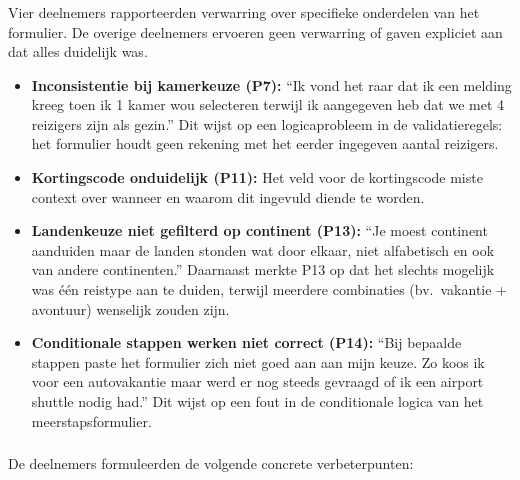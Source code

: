 \subsubsection{}

Vier deelnemers rapporteerden verwarring over specifieke onderdelen van het formulier. De overige deelnemers ervoeren geen verwarring of gaven expliciet aan dat alles duidelijk was.

\begin{itemize}
  \item \textbf{Inconsistentie bij kamerkeuze (P7):} ``Ik vond het raar dat ik een melding kreeg toen ik 1 kamer wou selecteren terwijl ik aangegeven heb dat we met 4 reizigers zijn als gezin.'' Dit wijst op een logicaprobleem in de validatieregels: het formulier houdt geen rekening met het eerder ingegeven aantal reizigers.
  \item \textbf{Kortingscode onduidelijk (P11):} Het veld voor de kortingscode miste context over wanneer en waarom dit ingevuld diende te worden.
  \item \textbf{Landenkeuze niet gefilterd op continent (P13):} ``Je moest continent aanduiden maar de landen stonden wat door elkaar, niet alfabetisch en ook van andere continenten.'' Daarnaast merkte P13 op dat het slechts mogelijk was één reistype aan te duiden, terwijl meerdere combinaties (bv.\ vakantie + avontuur) wenselijk zouden zijn.
  \item \textbf{Conditionale stappen werken niet correct (P14):} ``Bij bepaalde stappen paste het formulier zich niet goed aan aan mijn keuze. Zo koos ik voor een autovakantie maar werd er nog steeds gevraagd of ik een airport shuttle nodig had.'' Dit wijst op een fout in de conditionale logica van het meerstapsformulier.
\end{itemize}

\subsubsection{}

De deelnemers formuleerden de volgende concrete verbeterpunten:

